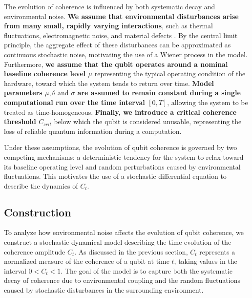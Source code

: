 \documentclass[
	a4paper, %
	10pt, %
	unnumberedsections, %
	twoside, %
]{LTJournalArticle}
\begin{document}
The evolution of coherence is influenced by both systematic decay and environmental noise. \textbf{We assume that environmental disturbances arise from many small, rapidly varying interactions}, such as thermal fluctuations, electromagnetic noise, and material defects \autocite{tepanyan2025decoherence}. By the central limit principle, the aggregate effect of these disturbances can be approximated as continuous stochastic noise, motivating the use of a Wiener process in the model. Furthermore, \textbf{we assume that the qubit operates around a nominal baseline coherence level $\mu$} representing the typical operating condition of the hardware, toward which the system tends to return over time. \textbf{Model parameters 
$\mu, \theta \text{ and } \sigma$ are assumed to remain constant during a single computational run over the time interval $[0,T]$}, allowing the system to be treated as time-homogeneous. \textbf{Finally, we introduce a critical coherence threshold $C_{crit}$} below which the qubit is considered unusable, representing the loss of reliable quantum information during a computation.

Under these assumptions, the evolution of qubit coherence is governed by two competing mechanisms: a deterministic tendency for the system to relax toward its baseline operating level and random perturbations caused by environmental fluctuations. This motivates the use of a stochastic differential equation to describe the dynamics of $C_t$.

\subsection{Construction}

To analyze how environmental noise affects the evolution of qubit coherence, we construct a stochastic dynamical model describing the time evolution of the coherence amplitude $C_t$. As discussed in the previous section, $C_t$ represents a normalized measure of the coherence of a qubit at time $t$, taking values in the interval $0<C_t<1$. The goal of the model is to capture both the systematic decay of coherence due to environmental coupling and the random fluctuations caused by stochastic disturbances in the surrounding environment.
\end{document}
